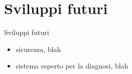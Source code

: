 \documentclass{beamer}
\begin{document}
\section{Sviluppi futuri}
%
\begin{frame}{Sviluppi futuri}
  \begin{itemize}
    \item sicurezza, blah
    \item sistema esperto per la diagnosi, blah
  \end{itemize}
   \begin{figure}[!h]
      \begin{center}
      \end{center}
    \end{figure}
\end{frame}
%
\end{document}
